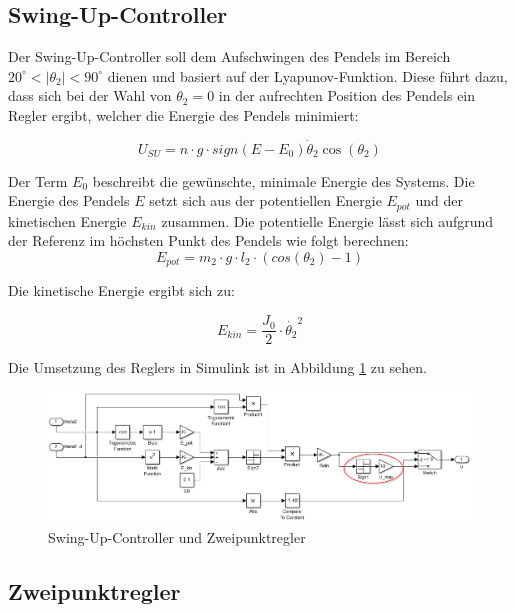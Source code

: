 \subsection{Swing-Up-Controller}
\label{Swing-Up-Controller} 

Der Swing-Up-Controller soll dem Aufschwingen des Pendels im Bereich $20^\circ < \left| \theta_2 \right| < 90^\circ$ dienen und basiert auf der Lyapunov-Funktion. Diese führt dazu, dass sich bei der Wahl von
$ \theta_2 = 0$ in der aufrechten Position des Pendels ein Regler ergibt, welcher die Energie des Pendels minimiert:

\begin{equation}
U_{SU} = n \cdot g \cdot sign(E-E_0)\dot{\theta}_2\cos(\theta_2)
\end{equation}

Der Term $E_0$ beschreibt die gewünschte, minimale Energie des Systems. Die Energie des Pendels $E$ setzt sich aus der potentiellen Energie $E_{pot}$ und der kinetischen Energie $E_{kin}$ zusammen. Die potentielle Energie lässt sich aufgrund der Referenz im höchsten Punkt des Pendels wie folgt berechnen:
\begin{equation}
E_{pot} = m_2 \cdot g \cdot l_2 \cdot (cos(\theta_2)-1)
\end{equation}

Die kinetische Energie ergibt sich zu:

\begin{equation}
E_{kin} = \frac{J_0}{2} \cdot \dot{\theta_2}^2
\end{equation}

Die Umsetzung des Reglers in Simulink ist in Abbildung \ref{fig.Simu_Swing-Up} zu sehen. 

\begin{figure}[h!]
  \centering	
  	\includegraphics[width=1\textwidth]{Grafiken/simulink_swingup.png}
      \caption{Swing-Up-Controller und Zweipunktregler}
	\label{fig.Simu_Swing-Up}
\end{figure}


\subsection{Zweipunktregler}
\label{zweipunktregler} 

